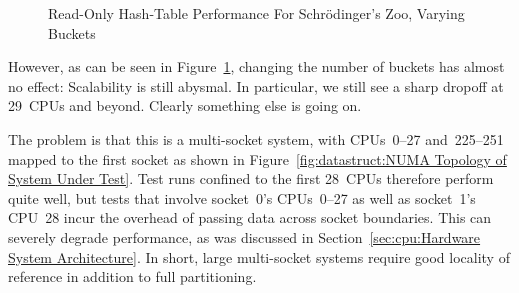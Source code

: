 \begin{figure}[tb]
\centering
{}
\caption{Read-Only Hash-Table Performance For Schr\"odinger's Zoo, Varying Buckets}
\label{fig:datastruct:Read-Only Hash-Table Performance For Schroedinger's Zoo, Varying Buckets}
\end{figure}

However, as can be seen in
Figure~\ref{fig:datastruct:Read-Only Hash-Table Performance For Schroedinger's Zoo, Varying Buckets},
changing the number of buckets has almost no effect:
Scalability is still abysmal.
In particular, we still see a sharp dropoff at 29~CPUs and beyond.
Clearly something else is going on.

The problem is that this is a multi-socket system, with CPUs~0--27
and~225--251 mapped to the first socket as shown in
Figure~\ref{fig:datastruct:NUMA Topology of System Under Test}.
Test runs confined to the first 28~CPUs therefore perform quite
well, but tests that involve socket~0's CPUs~0--27 as well as
socket~1's CPU~28 incur the overhead of passing data across
socket boundaries.
This can severely degrade performance, as was discussed in
Section~\ref{sec:cpu:Hardware System Architecture}.
In short, large multi-socket systems require good locality of reference
in addition to full partitioning.

\QuickQuizEnd


